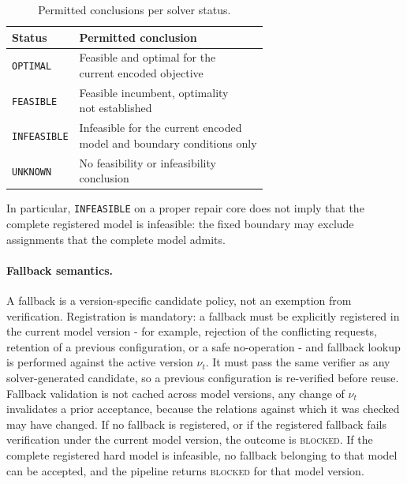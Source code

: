 \documentclass[pdflatex,sn-mathphys-num,iicol,oneside]{sn-jnl}
\begin{document}
\begin{table}[t]
\centering
\caption{Permitted conclusions per solver status.}
\label{tab:solver-status}
\setlength{\tabcolsep}{4pt}
\small
\begin{tabular}{ll}
\toprule
Status & Permitted conclusion\\
\midrule
\texttt{OPTIMAL} &
\shortstack[l]{Feasible and optimal for the\\current encoded objective}\\[2pt]
\texttt{FEASIBLE} &
\shortstack[l]{Feasible incumbent, optimality\\not established}\\[2pt]
\texttt{INFEASIBLE} &
\shortstack[l]{Infeasible for the current encoded\\model and boundary conditions only}\\[2pt]
\texttt{UNKNOWN} &
\shortstack[l]{No feasibility or infeasibility\\conclusion}\\
\bottomrule
\end{tabular}
\end{table}

In particular, \texttt{INFEASIBLE} on a proper repair core does not
imply that the complete registered model is infeasible: the fixed
boundary may exclude assignments that the complete model admits.

\paragraph{Fallback semantics.}
A fallback is a version-specific candidate policy, not an exemption
from verification. Registration is mandatory: a fallback must be
explicitly registered in the current model version - for example,
rejection of the conflicting requests, retention of a previous
configuration, or a safe no-operation - and fallback lookup is
performed against the active version $\nu_t$. It must pass the same
verifier as any solver-generated candidate, so a previous
configuration is re-verified before reuse. Fallback validation is not
cached across model versions, any change of $\nu_t$ invalidates a
prior acceptance, because the relations against which it was checked
may have changed. If no fallback is registered, or if the registered
fallback fails verification under the current model version, the
outcome is \textsc{blocked}. If the complete registered hard model is
infeasible, no fallback belonging to that model can be accepted, and
the pipeline returns \textsc{blocked} for that model version.
\end{document}
